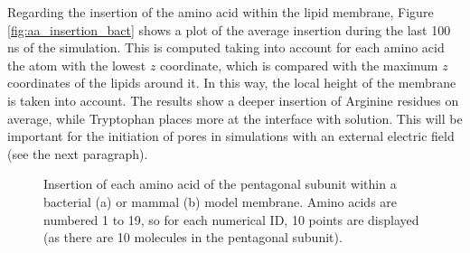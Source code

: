 Regarding the insertion of the amino acid within the lipid membrane, Figure \ref{fig:aa_insertion_bact} shows a plot of the average insertion during the last 100 ns of the simulation. This is computed taking into account for each amino acid the atom with the lowest $z$ coordinate, which is compared with the maximum $z$ coordinates of the lipids around it. In this way, the local height of the membrane is taken into account. The results show a deeper insertion of Arginine residues on average, while Tryptophan places more at the interface with solution. This will be important for the initiation of pores in simulations with an external electric field (see the next paragraph).
%
\begin{figure}[h!]
\centering
{}
\caption[Insertion of capzip amino acid in model membranes]{Insertion of each amino acid of the pentagonal subunit within a bacterial (a) or mammal (b) model membrane. Amino acids are numbered 1 to 19, so for each numerical ID, 10 points are displayed (as there are 10 molecules in the pentagonal subunit).}
\label{fig:aa_insertion}
\end{figure}


